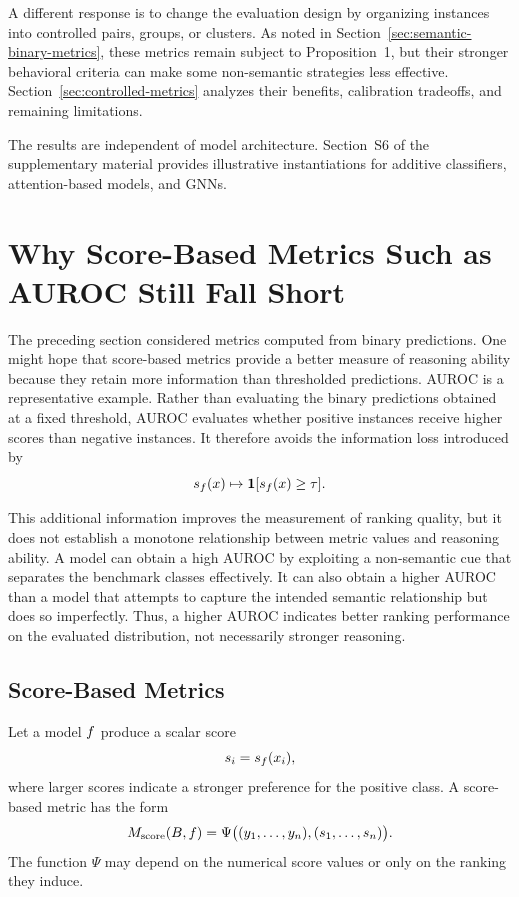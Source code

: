 \documentclass[acmsmall,screen,review,anonymous]{acmart}
\begin{document}
A different response is to change the evaluation design by organizing
instances into controlled pairs, groups, or clusters. As noted in
Section~\ref{sec:semantic-binary-metrics}, these metrics remain subject to
Proposition~1, but their stronger behavioral criteria can make some
non-semantic strategies less effective.
Section~\ref{sec:controlled-metrics} analyzes their benefits, calibration
tradeoffs, and remaining limitations.

The results are independent of model architecture. Section~S6 of the
supplementary material provides illustrative instantiations for additive classifiers,
attention-based models, and GNNs.

\section{Why Score-Based Metrics Such as AUROC Still Fall Short}
\label{sec:auroc}

The preceding section considered metrics computed from binary predictions.
One might hope that score-based metrics provide a better measure of reasoning
ability because they retain more information than thresholded predictions.
AUROC is a representative example. Rather than evaluating the binary
predictions obtained at a fixed threshold, AUROC evaluates whether positive
instances receive higher scores than negative instances. It therefore avoids
the information loss introduced by
\[
s_{f}(x)
\mapsto
\mathbf{1}[s_{f}(x)\ge \tau].
\]

This additional information improves the measurement of ranking quality, but
it does not establish a monotone relationship between metric values and
reasoning ability. A model can obtain a high AUROC by exploiting a
non-semantic cue that separates the benchmark classes effectively. It can
also obtain a higher AUROC than a model that attempts to capture the intended
semantic relationship but does so imperfectly. Thus, a higher AUROC indicates
better ranking performance on the evaluated distribution, not necessarily
stronger reasoning.

\subsection{Score-Based Metrics}

Let a model \(f\) produce a scalar score
\[
s_i=s_{f}(x_i),
\]
where larger scores indicate a stronger preference for the positive class. A
score-based metric has the form
\[
M_{\mathrm{score}}(B,f)
=
\Psi\big(
(y_1,\ldots,y_n),
(s_1,\ldots,s_n)
\big).
\]
The function \(\Psi\) may depend on the numerical score values or only on the
ranking they induce.
\end{document}
